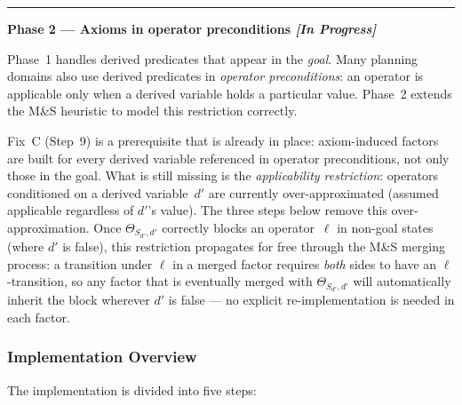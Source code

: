 \documentclass[11pt,a4paper]{article}
\begin{document}
\bigskip
\hrule\medskip
\noindent\textbf{Phase 2 — Axioms in operator preconditions \hfill\textit{[In Progress]}}
\medskip

Phase~1 handles derived predicates that appear in the \emph{goal}.  Many
planning domains also use derived predicates in \emph{operator preconditions}:
an operator is applicable only when a derived variable holds a particular value.
Phase~2 extends the M\&S heuristic to model this restriction correctly.

Fix~C (Step~9) is a prerequisite that is already in place: axiom-induced
factors are built for every derived variable referenced in operator
preconditions, not only those in the goal.  What is still missing is the
\emph{applicability restriction}: operators conditioned on a derived
variable~$d'$ are currently over-approximated (assumed applicable regardless of
$d'$'s value).  The three steps below remove this over-approximation.  Once
$\Theta_{S_{d'},d'}$ correctly blocks an operator~$\ell$ in non-goal states
(where $d'$ is false), this restriction propagates for free through the M\&S
merging process: a transition under $\ell$ in a merged factor requires
\emph{both} sides to have an $\ell$-transition, so any factor that is
eventually merged with $\Theta_{S_{d'},d'}$ will automatically inherit the
block wherever $d'$ is false --- no explicit re-implementation is needed in
each factor.

\subsubsection*{Implementation Overview}

The implementation is divided into five steps:
\end{document}
